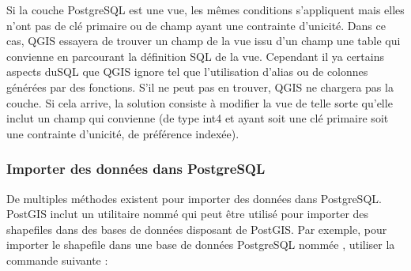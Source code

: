 Si la couche PostgreSQL est une vue, les mêmes conditions s'appliquent mais elles n'ont pas de clé primaire ou de champ ayant une contrainte d'unicité. Dans ce cas, QGIS essayera de trouver un champ de la vue issu d'un champ une table qui convienne en parcourant la définition SQL de la vue. Cependant il ya certains aspects duSQL que QGIS ignore tel que l'utilisation d'alias ou de colonnes générées par des fonctions. S'il ne peut pas en trouver, QGIS ne chargera pas la couche. Si cela arrive, la solution consiste à modifier la vue de telle sorte qu'elle inclut un champ qui convienne (de type int4 et ayant soit une clé primaire soit une contrainte d'unicité, de préférence indexée).

\subsubsection{Importer des données dans PostgreSQL}\label{sec:loading_postgis_data}

De multiples méthodes existent pour importer des données dans PostgreSQL. PostGIS inclut un utilitaire nommé  qui peut être utilisé pour importer des shapefiles dans des bases de données disposant de PostGIS. Par exemple, pour importer le shapefile  dans une base de données PostgreSQL nommée , utiliser la commande suivante :

